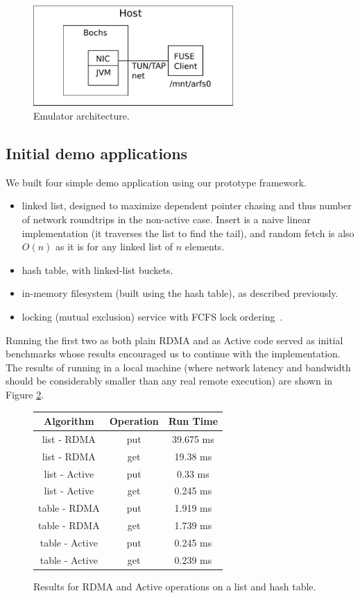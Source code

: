 \documentclass[10pt]{article}
\begin{document}
\begin{figure}
\centering
\includegraphics[width=3in]{fig/fig4.pdf}
\caption{Emulator architecture.}
\label{fig:fig4}
\end{figure}
  
\subsection{Initial demo applications}

We built four simple demo application using our prototype framework. 

\begin{itemize}
\item linked list, designed to maximize dependent pointer chasing and
  thus number of network roundtrips in the non-active case. Insert is
  a naive linear implementation (it traverses the list to find the
  tail), and random fetch is also $O(n)$ as it is for any linked list
  of $n$ elements.
\item hash table, with linked-list buckets.
\item in-memory filesystem (built using the hash table), as described
  previously.
\item locking (mutual exclusion) service with FCFS lock ordering~\cite{nic-basedatomic}.  
\end{itemize}

Running the first two as both plain RDMA and as Active code served as
initial benchmarks whose results encouraged us to continue with the
implementation. The results of running in a local machine (where
network latency and bandwidth should be considerably smaller than any
real remote execution) are shown in Figure \ref{res1}.

\begin{figure}[h!]
\center
\begin{tabular}{|ccc|}
\hline
Algorithm & Operation & Run Time\\
\hline
list - RDMA &  put & 39.675 ms \\
list - RDMA & get & 19.38 ms \\
\hline
list - Active & put & 0.33 ms \\
list - Active & get & 0.245 ms \\
\hline
\hline
table - RDMA  & put & 1.919 ms\\
table - RDMA   & get & 1.739 ms\\
\hline
table - Active  &put & 0.245 ms\\
table - Active & get & 0.239 ms\\
\hline
\end{tabular}
\caption{Results for RDMA and Active operations on a list and hash table.}
\label{res1}
\end{figure}
\end{document}

